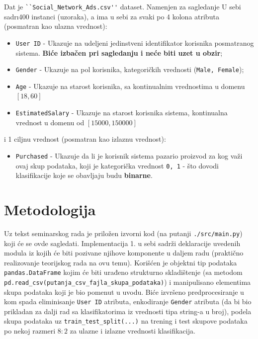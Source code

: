 \documentclass[fontsize=12bp, paper=a4]{scrarticle}
\begin{document}
Dat je \verb|``Social_Network_Ads.csv''| dataset.\cite{dataset} Namenjen za sagledanje  U sebi sadr\i 400 instanci (uzoraka), a ima u sebi za svaki po 4 kolona atributa (posmatran kao ulazna vrednost):
\begin{itemize}
    \item \verb|User ID| - Ukazuje na udeljeni jedinstveni identifikator korisnika posmatranog sistema. \textbf{Biće izbačen pri sagledanju i neće biti uzet u obzir};
    \item \verb|Gender| - Ukazuje na pol korisnika, kategoričkih vrednosti (\verb|Male, Female|);
    \item \verb|Age| - Ukazuje na starost korisnika, sa kontinualnim vrednostima u domenu $[18,60]$
    \item \verb|EstimatedSalary| - Ukazuje na starost korisnika sistema, kontinualna vrednost u domenu od $[15000, 150000]$
\end{itemize}
i 1 ciljnu vrednost (posmatran kao izlaznu vrednost):
\begin{itemize}
    \item \verb|Purchased| - Ukazuje da li je korisnik sistema pazario proizvod za kog važi ovaj skup podataka, koji je kategorička vrednost \verb|0, 1| - što dovodi klasifikacije koje se obavljaju budu \textbf{binarne}. 
\end{itemize}

\newpage
\section{Metodologija}





Uz tekst seminarskog rada je priložen izvorni kod (na putanji \verb|./src/main.py|) koji će se ovde sagledati. Implementacija 1. u sebi sadrži deklaracije uvedenih modula iz kojih će biti pozivane njihove komponente u daljem radu (praktično realizovanje teorijskog rada na ovu temu\cite{mojRad}). Korišćen je objektni tip podataka \verb|pandas.DataFrame|\cite{pandasDF} kojim će biti urađeno strukturno skladištenje (sa metodom \verb|pd.read_csv(putanja_csv_fajla_skupa_podataka)|) i manipulisano elementima skupa podataka koji je bio pomenut u uvodu. Biće izvršeno predprocesiranje u kom spada eliminisanje \verb|User ID| atributa, enkodiranje \verb|Gender| atributa (da bi bio prikladan za dalji rad sa klasifikatorima iz vrednosti tipa string-a u broj)\cite{labelEncoding}, podela skupa podataka uz \verb|train_test_split(...)| na trening i test skupove podataka po nekoj razmeri $8:2$ za ulazne i izlazne vrednosti klasifikacija.\cite{train_test_split}
\end{document}

